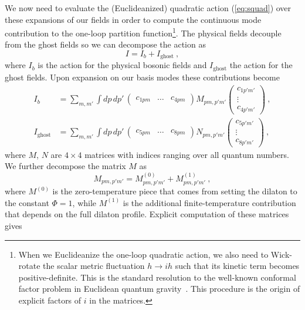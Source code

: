\documentclass[12pt]{article}
\begin{document}
We now need to evaluate the (Euclideanized) quadratic action (\ref{eq:squad}) over these expansions of our fields in order to compute the continuous mode contribution to the one-loop partition function\footnote{When we Euclideanize the one-loop quadratic action, we also need to Wick-rotate the scalar metric fluctuation $h \to i h$ such that its kinetic term becomes positive-definite.  This is the standard resolution to the well-known conformal factor problem in Euclidean quantum gravity~\cite{Gibbons:1978ac,Schleich:1987fm,Mazur:1989by}. This procedure is the origin of explicit factors of $i$ in the matrices.}.  The physical fields decouple from the ghost fields so we can decompose the action as
\begin{equation}
	I = I_b + I_\text{ghost}~,
\end{equation}
where $I_b$ is the action for the physical bosonic fields and $I_\text{ghost}$ the action for the ghost fields. Upon expansion on our basis modes these contributions become
\begin{equation}\begin{aligned}
	I_b &= \sum_{m,m'} \int dp\,dp'\,
	\begin{pmatrix}
		c_{1 p m} & \ldots & c_{4p m}	
	\end{pmatrix}
	M_{p m, p' m'}
	\begin{pmatrix}
		c_{1 p' m'} \\
		\vdots \\
		c_{4 p' m'}
	\end{pmatrix}~, \\
	I_\text{ghost} &= \sum_{m,m'} \int dp\,dp'\,
	\begin{pmatrix}
		c_{5 p m} & \ldots & c_{8 p m}	
	\end{pmatrix}
	N_{p m, p' m'}
	\begin{pmatrix}
		c_{5 p' m'} \\
		\vdots \\
		c_{8 p' m'}
	\end{pmatrix}~,
\end{aligned}\end{equation}
where $M$, $N$ are $4 \times 4$ matrices with indices ranging over all quantum numbers.  We further decompose 
the matrix $M$ as
\begin{equation}
	M_{pm,p'm'} = M_{pm,p'm'}^{(0)} + M_{pm,p'm'}^{(1)}~,
\end{equation}
where $M^{(0)}$ is the zero-temperature piece that comes from setting the dilaton to the constant $\Phi = 1$, while $M^{(1)}$ is the additional finite-temperature contribution that depends on the full dilaton profile.  Explicit computation of these matrices gives
\end{document}
